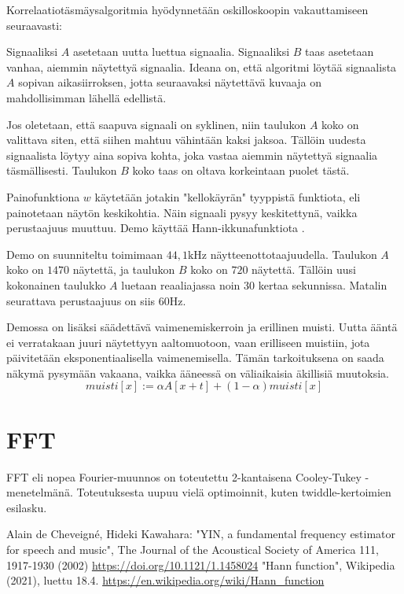 \documentclass[11pt,oneside,a4paper]{memoir}
\begin{document}
Korrelaatiotäsmäysalgoritmia hyödynnetään oskilloskoopin vakauttamiseen seuraavasti:

Signaaliksi $A$ asetetaan uutta luettua signaalia. Signaaliksi $B$ taas asetetaan vanhaa,
aiemmin näytettyä signaalia. Ideana on, että algoritmi löytää signaalista $A$ sopivan aikasiirroksen,
jotta seuraavaksi näytettävä kuvaaja on mahdollisimman lähellä edellistä.

Jos oletetaan, että saapuva signaali on syklinen, niin taulukon $A$ koko on valittava
siten, että siihen mahtuu vähintään kaksi jaksoa. Tällöin uudesta signaalista löytyy aina sopiva kohta,
joka vastaa aiemmin näytettyä signaalia täsmällisesti. Taulukon $B$ koko taas on oltava
korkeintaan puolet tästä.

Painofunktiona $w$ käytetään jotakin "kellokäyrän" tyyppistä funktiota, eli painotetaan
näytön keskikohtia. Näin signaali pysyy keskitettynä, vaikka perustaajuus muuttuu. Demo
käyttää Hann-ikkunafunktiota \cite{hann}.

Demo on suunniteltu toimimaan $44{,}1 \si{\kilo\hertz}$ näytteenottotaajuudella. Taulukon $A$ koko
on $1470$ näytettä, ja taulukon $B$ koko on $720$ näytettä. Tällöin uusi kokonainen taulukko
$A$ luetaan reaaliajassa noin 30 kertaa sekunnissa. Matalin seurattava perustaajuus on siis
$60 \si\hertz$.

Demossa on lisäksi säädettävä vaimenemiskerroin ja erillinen muisti. Uutta ääntä ei verratakaan
juuri näytettyyn aaltomuotoon, vaan erilliseen muistiin, jota päivitetään eksponentiaalisella
vaimenemisella. Tämän tarkoituksena on saada näkymä pysymään vakaana, vaikka ääneessä
on väliaikaisia äkillisiä muutoksia.
\[
\mathit{muisti}[x] := \alpha A[x+t] + (1-\alpha) \mathit{muisti}[x]
\]

\section*{FFT}

FFT eli nopea Fourier-muunnos on toteutettu 2-kantaisena Cooley-Tukey -menetelmänä. Toteutuksesta uupuu vielä
optimoinnit, kuten twiddle-kertoimien esilasku.


\begin{thebibliography}{1}
 Alain de Cheveigné, Hideki Kawahara: "YIN, a fundamental frequency estimator for speech and music", The Journal of the Acoustical Society of America 111, 1917-1930 (2002) \url{https://doi.org/10.1121/1.1458024}
 "Hann function", Wikipedia (2021), luettu 18.4. \url{https://en.wikipedia.org/wiki/Hann_function}
\end{thebibliography}
\end{document}
